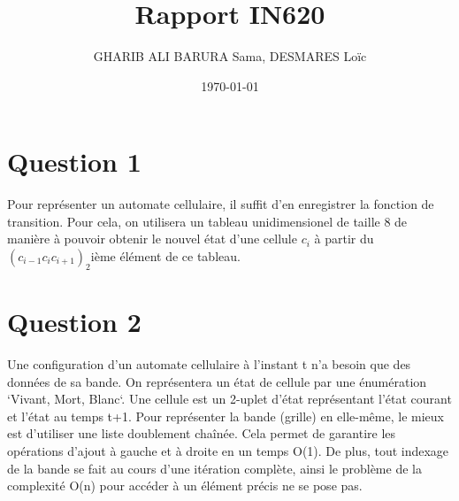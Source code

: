 \documentclass{article}
\title{Rapport IN620}
\date{\today}
\author{GHARIB ALI BARURA Sama, DESMARES Loïc}
\begin{document}
  \maketitle

  \newpage

  \section{Question 1}
    Pour représenter un automate cellulaire, il suffit d'en enregistrer la fonction de
  transition. Pour cela, on utilisera un tableau unidimensionel de taille 8 de manière
  à pouvoir obtenir le nouvel état d'une cellule \(c_i\) à partir du
  \((c_{i-1} c_i c_{i+1})_2\)ième élément de ce tableau.

  \section{Question 2}
      Une configuration d'un automate cellulaire à l'instant t n'a besoin que des données
  de sa bande. On représentera un état de cellule par une énumération `Vivant, Mort, Blanc`.
  Une cellule est un 2-uplet d'état représentant l'état courant et l'état au temps t+1.
  Pour représenter la bande (grille) en elle-même, le mieux est d'utiliser une liste doublement
  chaînée. Cela permet de garantire les opérations d'ajout à gauche et à droite en un temps
  O(1). De plus, tout indexage de la bande se fait au cours d'une itération complète, ainsi
  le problème de la complexité O(n) pour accéder à un élément précis ne se pose pas.


  
\end{document}
